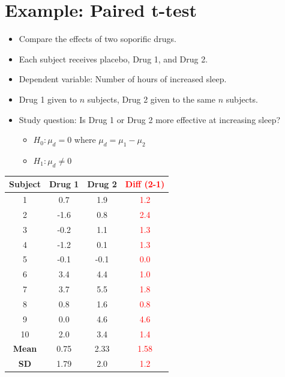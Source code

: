 \documentclass[14pt]{extarticle}
\begin{document}
\newpage

\section*{Example: Paired t-test}

\begin{itemize}
    \item Compare the effects of two soporific drugs.
    \item Each subject receives placebo, Drug 1, and Drug 2.
    \item Dependent variable: Number of hours of increased sleep.
    \item Drug 1 given to $n$ subjects, Drug 2 given to the same $n$ subjects.
    \item Study question: Is Drug 1 or Drug 2 more effective at increasing sleep?
    \begin{itemize}
        \item $H_0: \mu_d = 0$ \quad where $\mu_d = \mu_1 - \mu_2$
        \item $H_1: \mu_d \neq 0$
    \end{itemize}
\end{itemize}

\begin{center} %
\begin{tabular}{|c|c|c|c|} %
\hline
\textbf{Subject} & \textbf{Drug 1} & \textbf{Drug 2} & \textcolor{red}{\textbf{Diff (2-1)}} \\ 
\hline
1  & 0.7  & 1.9  & \textcolor{red}{1.2} \\
2  & -1.6 & 0.8  & \textcolor{red}{2.4} \\
3  & -0.2 & 1.1  & \textcolor{red}{1.3} \\
4  & -1.2 & 0.1  & \textcolor{red}{1.3} \\
5  & -0.1 & -0.1 & \textcolor{red}{0.0} \\
6  & 3.4  & 4.4  & \textcolor{red}{1.0} \\
7  & 3.7  & 5.5  & \textcolor{red}{1.8} \\
8  & 0.8  & 1.6  & \textcolor{red}{0.8} \\
9  & 0.0  & 4.6  & \textcolor{red}{4.6} \\
10 & 2.0  & 3.4  & \textcolor{red}{1.4} \\
\hline
\textbf{Mean} & 0.75 & 2.33 & \textcolor{red}{1.58} \\
\textbf{SD}   & 1.79 & 2.0  & \textcolor{red}{1.2} \\
\hline
\end{tabular}
\end{center}
\end{document}
